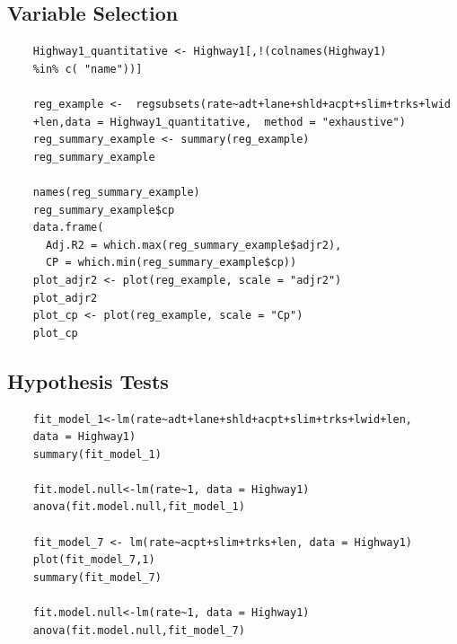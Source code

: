 \documentclass[12pt]{report}
\begin{document}
\subsection{Variable Selection}
\begin{lstlisting}
    Highway1_quantitative <- Highway1[,!(colnames(Highway1) 
    %in% c( "name"))]

    reg_example <-  regsubsets(rate~adt+lane+shld+acpt+slim+trks+lwid
    +len,data = Highway1_quantitative,  method = "exhaustive")
    reg_summary_example <- summary(reg_example)
    reg_summary_example

    names(reg_summary_example) 
    reg_summary_example$cp
    data.frame(
      Adj.R2 = which.max(reg_summary_example$adjr2),
      CP = which.min(reg_summary_example$cp))
    plot_adjr2 <- plot(reg_example, scale = "adjr2")
    plot_adjr2
    plot_cp <- plot(reg_example, scale = "Cp")
    plot_cp
\end{lstlisting}

\subsection{Hypothesis Tests}
\begin{lstlisting}
    fit_model_1<-lm(rate~adt+lane+shld+acpt+slim+trks+lwid+len,
    data = Highway1)
    summary(fit_model_1)

    fit.model.null<-lm(rate~1, data = Highway1)
    anova(fit.model.null,fit_model_1)

    fit_model_7 <- lm(rate~acpt+slim+trks+len, data = Highway1)
    plot(fit_model_7,1)
    summary(fit_model_7)

    fit.model.null<-lm(rate~1, data = Highway1)
    anova(fit.model.null,fit_model_7)
\end{lstlisting}
\end{document}
